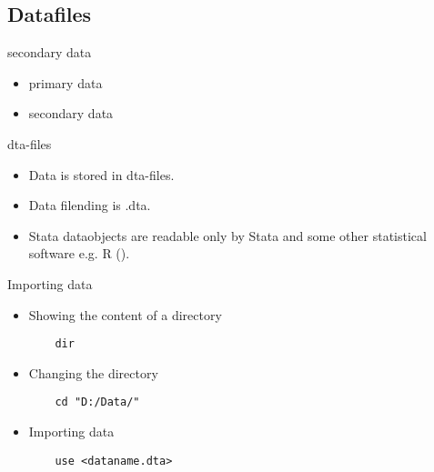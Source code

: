 \subsection{Datafiles}
\begin{frame}{secondary data}
 \begin{itemize}
  \item primary data
  \item secondary data
 \end{itemize}


\end{frame}

\begin{frame}{dta-files}
  \begin{itemize}
  \item Data is stored in dta-files.
  \item Data filending is .dta.
  \item Stata dataobjects are readable only by Stata and some other statistical software e.g. R (\cite{R13}).
  \end{itemize}
\end{frame}

\begin{frame}[fragile]{Importing data}
  \begin{itemize}
    \item Showing the content of a directory 
    \begin{lstlisting}
    dir
    \end{lstlisting}
    \item Changing the directory 
    \begin{lstlisting}
    cd "D:/Data/"
    \end{lstlisting}
    \item Importing data  
    \begin{lstlisting}
    use <dataname.dta>
    \end{lstlisting}
  \end{itemize}
  
  
\end{frame}

